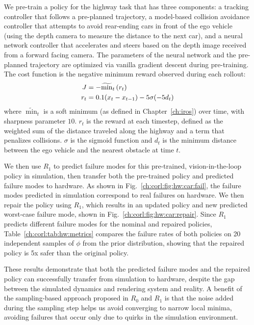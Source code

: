 We pre-train a policy for the highway task that has three components: a tracking controller that follows a pre-planned trajectory, a model-based collision avoidance controller that attempts to avoid rear-ending cars in front of the ego vehicle (using the depth camera to measure the distance to the next car), and a neural network controller that accelerates and steers based on the depth image received from a forward facing camera. The parameters of the neural network and the pre-planned trajectory are optimized via vanilla gradient descent during pre-training. The cost function is the negative minimum reward observed during each rollout:
\begin{align}
    J   & = -\widetilde{\min}_t\left( r_t \right)            \\
    r_t & = 0.1 (x_t - x_{t-1}) - 5 \sigma(-5 d_t)
\end{align}
where $\widetilde{\min}_t$ is a soft minimum (as defined in Chapter~\ref{ch:iros}) over time, with sharpness parameter $10$. $r_t$ is the reward at each timestep, defined as the weighted sum of the distance traveled along the highway and a term that penalizes collisions. $\sigma$ is the sigmoid function and $d_t$ is the minimum distance between the ego vehicle and the nearest obstacle at time $t$.

We then use $R_1$ to predict failure modes for this pre-trained, vision-in-the-loop policy in simulation, then transfer both the pre-trained policy and predicted failure modes to hardware. As shown in Fig.~\ref{ch:corl:fig:hw:car:fail}, the failure modes predicted in simulation correspond to real failures on hardware. We then repair the policy using $R_1$, which results in an updated policy and new predicted worst-case failure mode, shown in Fig.~\ref{ch:corl:fig:hw:car:repair}. Since $R_1$ predicts different failure modes for the nominal and repaired policies, Table~\ref{ch:corl:tab:hw:metrics} compares the failure rates of both policies on 20 independent samples of $\phi$ from the prior distribution, showing that the repaired policy is 5x safer than the original policy.

These results demonstrate that both the predicted failure modes and the repaired policy can successfully transfer from simulation to hardware, despite the gap between the simulated dynamics and rendering system and reality. A benefit of the sampling-based approach proposed in $R_0$ and $R_1$ is that the noise added during the sampling step helps us avoid converging to narrow local minima, avoiding failures that occur only due to quirks in the simulation environment.

